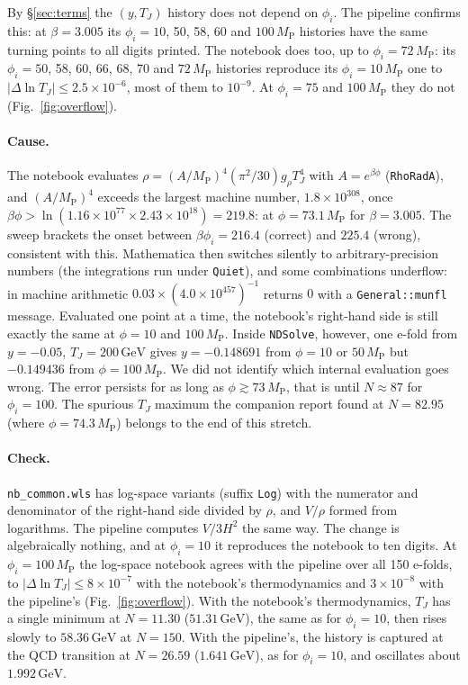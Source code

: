 \documentclass[11pt,a4paper]{article}
\newcommand{\MP}{M_{\mathrm{P}}}
\newcommand{\TJ}{T_{J}}
\newcommand{\GeV}{\,\mathrm{GeV}}
\newcommand{\code}[1]{\texttt{#1}}
\begin{document}
By \S\ref{sec:terms} the $(y, \TJ)$ history does not depend on $\phi_i$. The pipeline confirms
this: at $\beta = 3.005$ its $\phi_i = 10$, 50, 58, 60 and $100\,\MP$ histories have the same
turning points to all digits printed. The notebook does too, up to $\phi_i = 72\,\MP$: its
$\phi_i = 50$, 58, 60, 66, 68, 70 and $72\,\MP$ histories reproduce its $\phi_i = 10\,\MP$ one to
$|\Delta\ln\TJ| \le 2.5\times10^{-6}$, most of them to $10^{-9}$. At $\phi_i = 75$ and $100\,\MP$ they do not (Fig.~\ref{fig:overflow}).

\paragraph{Cause.} The notebook evaluates $\rho = (A/\MP)^4(\pi^2/30)g_\rho\TJ^4$ with
$A = e^{\beta\phi}$ (\code{RhoRadA}), and $(A/\MP)^4$ exceeds the largest machine number,
$1.8\times10^{308}$, once $\beta\phi > \ln(1.16\times10^{77}\times2.43\times10^{18}) = 219.8$:
at $\phi = 73.1\,\MP$ for $\beta = 3.005$. The sweep brackets the onset between $\beta\phi_i =
216.4$ (correct) and $225.4$ (wrong), consistent with this. Mathematica then switches silently to
arbitrary-precision numbers (the integrations run under \code{Quiet}), and some combinations
underflow: in machine arithmetic $0.03\times(4.0\times10^{457})^{-1}$ returns $0$ with a
\code{General::munfl} message. Evaluated one point at a time, the notebook's right-hand side is
still exactly the same at $\phi = 10$ and $100\,\MP$. Inside \code{NDSolve}, however, one e-fold
from $y = -0.05$, $\TJ = 200\GeV$ gives $y = -0.148691$ from $\phi = 10$ or $50\,\MP$ but
$-0.149436$ from $\phi = 100\,\MP$. We did not identify which internal evaluation goes wrong.
The error persists for as long as $\phi \gtrsim 73\,\MP$, that is until $N \approx 87$ for
$\phi_i = 100$. The spurious $\TJ$ maximum the companion report found at $N = 82.95$ (where
$\phi = 74.3\,\MP$) belongs to the end of this stretch.

\paragraph{Check.} \code{nb\_common.wls} has log-space variants (suffix \code{Log}) with the
numerator and denominator of the right-hand side divided by $\rho$, and $V/\rho$ formed from
logarithms. The pipeline computes $V/3H^2$ the same way. The change is algebraically
nothing, and at $\phi_i = 10$ it reproduces the notebook to ten digits. At $\phi_i = 100\,\MP$
the log-space notebook agrees with the pipeline over all 150 e-folds, to $|\Delta\ln\TJ| \le
8\times10^{-7}$ with the notebook's thermodynamics and $3\times10^{-8}$ with the pipeline's
(Fig.~\ref{fig:overflow}). With the notebook's
thermodynamics, $\TJ$ has a single minimum at $N = 11.30$ ($51.31\GeV$), the same as for
$\phi_i = 10$, then rises slowly to $58.36\GeV$ at $N = 150$. With the pipeline's, the history
is captured at the QCD transition at $N = 26.59$ ($1.641\GeV$), as for $\phi_i = 10$, and
oscillates about $1.992\GeV$.
\end{document}
